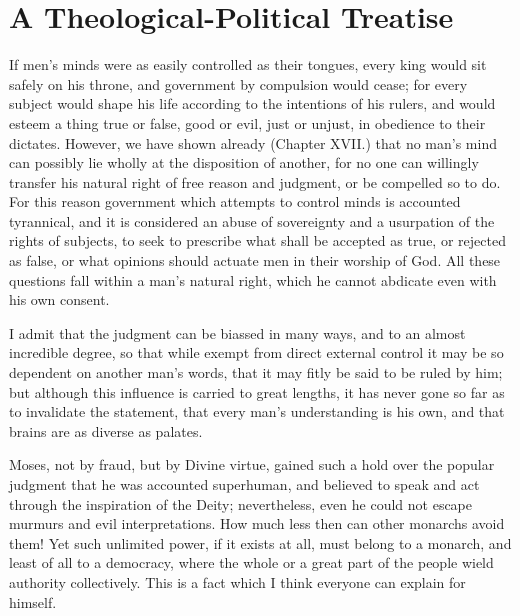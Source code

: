 
\author{Benedict de Spinoza}
\chapter[A Theological-Political Treatise, chap. 20]{A
Theological-Political Treatise}


If men's minds were as easily controlled as their tongues,
every king would sit safely on his throne, and government by
compulsion would cease; for every subject would shape his life
according to the intentions of his rulers, and would esteem a thing
true or false, good or evil, just or unjust, in obedience to their
dictates. However, we have shown already (Chapter XVII.) that no man's
mind can possibly lie wholly at the disposition of another, for no
one can willingly transfer his natural right of free reason and
judgment, or be compelled so to do. For this reason government which
attempts to control minds is accounted tyrannical, and it is
considered an abuse of sovereignty and a usurpation of the rights of
subjects, to seek to prescribe what shall be accepted as true, or
rejected as false, or what opinions should actuate men in their
worship of God. All these questions fall within a man's natural right,
which he cannot abdicate even with his own consent.

I admit that the judgment can be biassed in many ways, and to an
almost incredible degree, so that while exempt from direct external
control it may be so dependent on another man's words, that it may
fitly be said to be ruled by him; but although this influence is
carried to great lengths, it has never gone so far as to invalidate
the statement, that every man's understanding is his own, and that
brains are as diverse as palates.

Moses, not by fraud, but by Divine virtue, gained such a hold over the
popular judgment that he was accounted superhuman, and believed to
speak and act through the inspiration of the Deity; nevertheless, even
he could not escape murmurs and evil interpretations. How much less
then can other monarchs avoid them! Yet such unlimited power, if it
exists at all, must belong to a monarch, and  least of all
to a democracy, where the whole or a great part of the people wield
authority collectively. This is a fact which I think everyone can
explain for himself.

